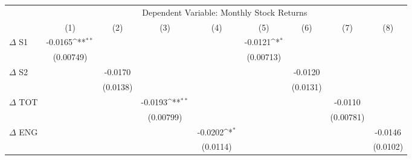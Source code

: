 {
\def\sym#1{\ifmmode^{#1}\else\(^{#1}\)\fi}
\begin{tabular}{l*{8}{c}}
\hline\hline
                    &\multicolumn{8}{c}{Dependent Variable: Monthly Stock Returns}                                                                                                                  \\\cmidrule(lr){2-9}
                    &\multicolumn{1}{c}{(1)}         &\multicolumn{1}{c}{(2)}         &\multicolumn{1}{c}{(3)}         &\multicolumn{1}{c}{(4)}         &\multicolumn{1}{c}{(5)}         &\multicolumn{1}{c}{(6)}         &\multicolumn{1}{c}{(7)}         &\multicolumn{1}{c}{(8)}         \\
\hline
$\Delta$ S1         &     -0.0165\sym{**} &                     &                     &                     &     -0.0121\sym{*}  &                     &                     &                     \\
                    &   (0.00749)         &                     &                     &                     &   (0.00713)         &                     &                     &                     \\
$\Delta$ S2         &                     &     -0.0170         &                     &                     &                     &     -0.0120         &                     &                     \\
                    &                     &    (0.0138)         &                     &                     &                     &    (0.0131)         &                     &                     \\
$\Delta$ TOT        &                     &                     &     -0.0193\sym{**} &                     &                     &                     &     -0.0110         &                     \\
                    &                     &                     &   (0.00799)         &                     &                     &                     &   (0.00781)         &                     \\
$\Delta$ ENG        &                     &                     &                     &     -0.0202\sym{*}  &                     &                     &                     &     -0.0146         \\
                    &                     &                     &                     &    (0.0114)         &                     &                     &                     &    (0.0102)         \\

\end{tabular}}
